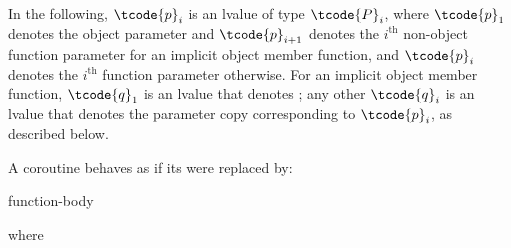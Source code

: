\pnum
In the following, $\tcode{p}_i$ is an lvalue of type $\tcode{P}_i$,
where
$\tcode{p}_1$ denotes the object parameter and
$\tcode{p}_{i+1}$ denotes the $i^\text{th}$ non-object function parameter
for an implicit object member function, and
$\tcode{p}_i$ denotes
the $i^\text{th}$ function parameter otherwise.
For an implicit object member function,
$\tcode{q}_1$ is an lvalue that denotes ;
any other $\tcode{q}_i$ is an lvalue
that denotes the parameter copy corresponding to $\tcode{p}_i$,
as described below.

\pnum
A coroutine behaves as if its  were replaced by:
\begin{ncsimplebnf}
\terminal{\{}\br
\bnfindent {}   \terminal{;}\br
\bnfindent {} \terminal{\{}\br
\bnfindent\bnfindent {}  \terminal{;}\br
\bnfindent\bnfindent function-body\br
\bnfindent {}\br
\bnfindent\bnfindent {}\br
\bnfindent\bnfindent\bnfindent {} \terminal{;}\br
\bnfindent\bnfindent {} \terminal{;}\br
\bnfindent \terminal{\}}\br
{} \terminal{:}\br
\bnfindent {}  \terminal{;}\br
\terminal{\}}
\end{ncsimplebnf}
where
